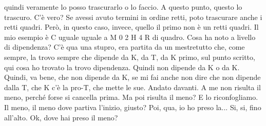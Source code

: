 \begin{soluzione}
quindi veramente lo posso trascurarlo o lo faccio. A questo punto, questo lo trascuro. C'è vero? Se avessi avuto termini in ordine retti, poto trascurare anche i retti quadri. Però, in questo caso, invece, quello il primo non è un retti quadri. Il mio esempio è C uguale uguale a M 0 2 H 4 R di quadro. Cosa ha noto a livello di dipendenza? C'è qua una stupro, era partita da un mestretutto che, come sempre, la trovo sempre che dipende da K, da T, da K primo, sul punto scritto, qui cosa ho trovato la trovo dipendenza. Quindi non dipende da K o da K. Quindi, va bene, che non dipende da K, se mi fai anche non dire che non dipende dalla T, che K c'è la pro-T, che mette le sue. Andato davanti. A me non risulta il meno, perché forse si cancella prima. Ma poi risulta il meno? E lo riconfogliamo. Il meno, il meno dove partiva l'inizio, giusto? Poi, qua, io ho preso la... Si, si, fino all'alto. Ok, dove hai preso il meno? 
   

\end{soluzione}
